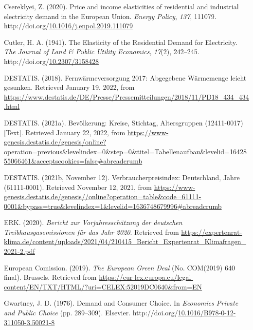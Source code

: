 \documentclass[12pt,twoside]{reedthesis}
\newlength{\cslhangindent}
\newenvironment{CSLReferences}[2] %
 {%
  \setlength{\parindent}{0pt}
  \ifodd #1 \everypar{\setlength{\hangindent}{\cslhangindent}}\ignorespaces\fi
  \ifnum #2 > 0
  \setlength{\parskip}{#2\baselineskip}
  \fi
 }%
 {}
\begin{document}
\begin{CSLReferences}{1}{0}
\leavevmode{}%
Csereklyei, Z. (2020). Price and income elasticities of residential and industrial electricity demand in the European Union. \emph{Energy Policy}, \emph{137}, 111079. http://doi.org/\href{https://doi.org/10.1016/j.enpol.2019.111079}{10.1016/j.enpol.2019.111079}

\leavevmode{}%
Cutler, H. A. (1941). The Elasticity of the Residential Demand for Electricity. \emph{The Journal of Land \& Public Utility Economics}, \emph{17}(2), 242--245. http://doi.org/\href{https://doi.org/10.2307/3158428}{10.2307/3158428}

\leavevmode{}%
DESTATIS. (2018). Fernwärmeversorgung 2017: Abgegebene Wärmemenge leicht gesunken. Retrieved January 19, 2022, from \url{https://www.destatis.de/DE/Presse/Pressemitteilungen/2018/11/PD18_434_434.html}

\leavevmode{}%
DESTATIS. (2021a). Bevölkerung: Kreise, Stichtag, Altersgruppen (12411-0017) {[}Text{]}. Retrieved January 22, 2022, from \url{https://www-genesis.destatis.de/genesis/online?operation=previous\&levelindex=0\&step=0\&titel=Tabellenaufbau\&levelid=1642855066461\&acceptscookies=false\#abreadcrumb}

\leavevmode{}%
DESTATIS. (2021b, November 12). Verbraucherpreisindex: Deutschland, Jahre (61111-0001). Retrieved November 12, 2021, from \url{https://www-genesis.destatis.de/genesis//online?operation=table\&code=61111-0001\&bypass=true\&levelindex=1\&levelid=1636748679996\#abreadcrumb}

\leavevmode{}%
ERK. (2020). \emph{Bericht zur Vorjahresschätzung der deutschen Treibhausgasemissionen für das Jahr 2020}. Retrieved from \url{https://expertenrat-klima.de/content/uploads/2021/04/210415_Bericht_Expertenrat_Klimafragen_2021-2.pdf}

\leavevmode{}%
European Comission. (2019). \emph{The European Green Deal} (No. COM(2019) 640 final). Brussels. Retrieved from \url{https://eur-lex.europa.eu/legal-content/EN/TXT/HTML/?uri=CELEX:52019DC0640\&from=EN}

\leavevmode{}%
Gwartney, J. D. (1976). Demand and Consumer Choice. In \emph{Economics Private and Public Choice} (pp. 289--309). Elsevier. http://doi.org/\href{https://doi.org/10.1016/B978-0-12-311050-3.50021-8}{10.1016/B978-0-12-311050-3.50021-8}


\end{CSLReferences}
\end{document}
